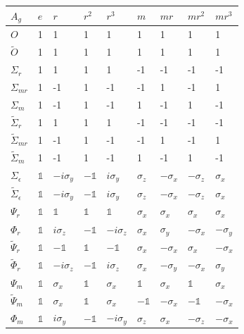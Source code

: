 \documentclass[two column]{article}
\begin{document}
\begin{table}[]
    \centering
    \begin{tabular}{|l||l|l|l|l|l|l|l|l|}
    \hline
  $A_g$ & $e$ &   $r$ & $r^2$ & $r^3$ &  $m$ & $mr$ & $mr^2$ & $mr^3$ \\
\hline\hline
  $O$ & 1 &   1 &  1 &   1 &  1 &  1 &   1 &    1 \\\hline
 $\tilde{O}$ & 1 &   1 &  1 &   1 &  1 &  1 &   1 &    1 \\\hline
  $\Sigma_{r}$ & 1 &   1 &  1 &   1 & -1 & -1 &  -1 &   -1 \\\hline
 $\Sigma_{mr}$ & 1 &  -1 &  1 &  -1 & -1 &  1 &  -1 &    1 \\\hline
  $\Sigma_{m}$ & 1 &  -1 &  1 &  -1 &  1 & -1 &   1 &   -1 \\\hline
 $\tilde{\Sigma}_{r}$ & 1 &   1 &  1 &   1 & -1 & -1 &  -1 &   -1 \\\hline
$\tilde{\Sigma}_{mr}$ & 1 &  -1 &  1 &  -1 & -1 &  1 &  -1 &    1 \\\hline
 $\tilde{\Sigma}_{m}$ & 1 &  -1 &  1 &  -1 &  1 & -1 &   1 &   -1 \\\hline
  $\Sigma_{\epsilon}$ &$\mathbb{1}$&$-i\sigma_y$ &$-\mathbb{1}$& $i\sigma_y$ & $\sigma_z$ &$-\sigma_x$ & $-\sigma_z$ &   $\sigma_x$ \\\hline
 $\tilde{\Sigma}_{\epsilon}$ &$\mathbb{1}$&$-i\sigma_y$ &$-\mathbb{1}$& $i\sigma_y$ & $\sigma_z$ &$-\sigma_x$ & $-\sigma_z$ &   $\sigma_x$ \\\hline
$\Psi_{r}$ &$\mathbb{1}$&  $\mathbb{1}$& $\mathbb{1}$&  $\mathbb{1}$& $\sigma_x$ & $\sigma_x$ &  $\sigma_x$ &   $\sigma_x$ \\\hline
$\Phi_{r}$ &$\mathbb{1}$& $i\sigma_z$ &$-\mathbb{1}$&$-i\sigma_z$ & $\sigma_x$ & $\sigma_y$ & $-\sigma_x$ &  $-\sigma_y$ \\\hline
$\tilde{\Psi}_{r}$ &$\mathbb{1}$& $-\mathbb{1}$& $\mathbb{1}$& $-\mathbb{1}$& $\sigma_x$ &$-\sigma_x$ &  $\sigma_x$ &  $-\sigma_x$ \\\hline
$\tilde{\Phi}_{r}$ &$\mathbb{1}$&$-i\sigma_z$ &$-\mathbb{1}$& $i\sigma_z$ & $\sigma_x$ &$-\sigma_y$ & $-\sigma_x$ &   $\sigma_y$ \\\hline
 $\Psi_{m}$ &$\mathbb{1}$&  $\sigma_x$ & $\mathbb{1}$&  $\sigma_x$ & $\mathbb{1}$& $\sigma_x$ &  $\mathbb{1}$&   $\sigma_x$ \\\hline
 $\tilde{\Psi}_{m}$ &$\mathbb{1}$&  $\sigma_x$ & $\mathbb{1}$&  $\sigma_x$ &$-\mathbb{1}$&$-\sigma_x$ & $-\mathbb{1}$&  $-\sigma_x$ \\\hline
 $\Phi_{m}$ &$\mathbb{1}$&$i\sigma_y$ &$-\mathbb{1}$& $-i\sigma_y$ & $\sigma_z$ & $\sigma_x$ & $-\sigma_z$ &  $-\sigma_x$ \\\hline

\end{tabular}
\end{table}
\end{document}
